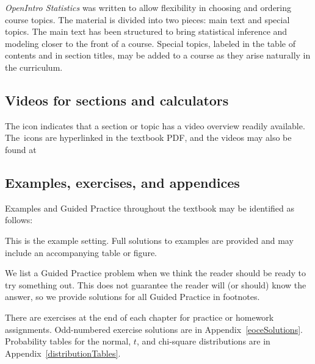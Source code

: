 \emph{OpenIntro Statistics} was written to allow flexibility in choosing and ordering course topics. The material is divided into two pieces: main text and special topics. The main text has been structured to bring statistical inference and modeling closer to the front of a course. Special topics, labeled in the table of contents and in section titles, may be added to a course as they arise naturally in the curriculum.


\subsection*{Videos for sections and calculators}

The  icon indicates that a section or topic has a video overview readily available. The~icons are hyperlinked in the textbook PDF, and the videos may also be found at
\begin{center}
\end{center}


\subsection*{Examples, exercises, and appendices}

Examples and Guided Practice throughout the textbook may be
identified as follows:

\begin{examplewrap}[8mm]
\begin{nexample}{This is the example setting.}
  Full solutions to examples are provided and may include
  an accompanying table or figure.
\end{nexample}
\end{examplewrap}

\begin{exercisewrap}[8mm]
\begin{nexercise}
We list a Guided Practice problem when we think the reader
should be ready to try something out.
This does not guarantee the reader will (or should)
know the answer, so we provide solutions for all Guided
Practice in footnotes.\footnotemark
\end{nexercise}
\end{exercisewrap}

There are exercises at the end of each chapter for practice or homework assignments. Odd-numbered exercise solutions are in Appendix~\ref{eoceSolutions}. Probability tables for the normal, $t$, and chi-square distributions are in Appendix~\ref{distributionTables}.

